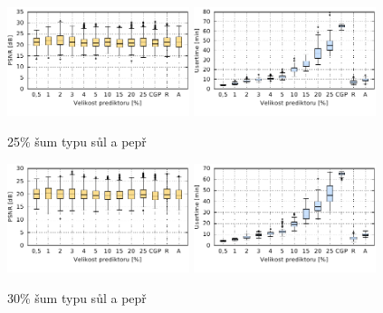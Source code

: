 \begin{figure}[H]
    \centering
    \includegraphics[width=0.475\textwidth]{fig/plot/compare/saltpepper25-100kg-psnrtest.pdf}
    \hskip0.5cm
    \includegraphics[width=0.475\textwidth]{fig/plot/compare/saltpepper25-100kg-usertime.pdf}
    \caption{25\% šum typu sůl a pepř}
\end{figure}

\begin{figure}[H]
    \centering
    \includegraphics[width=0.475\textwidth]{fig/plot/compare/saltpepper30-100kg-psnrtest.pdf}
    \hskip0.5cm
    \includegraphics[width=0.475\textwidth]{fig/plot/compare/saltpepper30-100kg-usertime.pdf}
    \caption{30\% šum typu sůl a pepř}
\end{figure}


